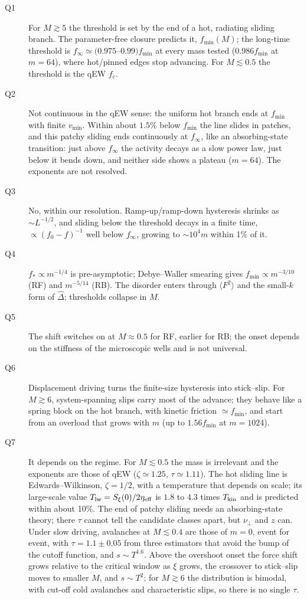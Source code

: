 \documentclass[10pt,a4paper]{article}
\newcommand{\fcs}{f_c}
\begin{document}
\begin{description}
\item[Q1] For $M\gtrsim5$ the threshold is set by the end of a hot, radiating sliding branch. The parameter-free closure predicts it, $f_{\min}(M)$; the long-time threshold is $f_\infty\simeq(0.975$--$0.99)f_{\min}$ at every mass tested ($0.986f_{\min}$ at $m=64$), where hot/pinned edges stop advancing. For $M\lesssim0.5$ the threshold is the qEW $\fcs$.
\item[Q2] Not continuous in the qEW sense: the uniform hot branch ends at $f_{\min}$ with finite $v_{\min}$. Within about $1.5\%$ below $f_{\min}$ the line slides in patches, and this patchy sliding ends continuously at $f_\infty$, like an absorbing-state transition: just above $f_\infty$ the activity decays as a slow power law, just below it bends down, and neither side shows a plateau ($m=64$). The exponents are not resolved.
\item[Q3] No, within our resolution. Ramp-up/ramp-down hysteresis shrinks as $\sim L^{-1/2}$, and sliding below the threshold decays in a finite time, $\propto(f_0-f)^{-1}$ well below $f_\infty$, growing to $\sim10^4m$ within 1\% of it.
\item[Q4] $f_*\propto m^{-1/4}$ is pre-asymptotic; Debye--Waller smearing gives $f_{\min}\propto m^{-3/10}$ (RF) and $m^{-5/14}$ (RB). The disorder enters through $\langle F^2\rangle$ and the small-$k$ form of $\hat\Delta$; thresholds collapse in $M$.
\item[Q5] The shift switches on at $M\approx0.5$ for RF, earlier for RB; the onset depends on the stiffness of the microscopic wells and is not universal.
\item[Q6] Displacement driving turns the finite-size hysteresis into stick--slip. For $M\gtrsim6$, system-spanning slips carry most of the advance; they behave like a spring block on the hot branch, with kinetic friction $\simeq f_{\min}$, and start from an overload that grows with $m$ (up to $1.56f_{\min}$ at $m=1024$).
\item[Q7] It depends on the regime. For $M\lesssim0.5$ the mass is irrelevant and the exponents are those of qEW ($\zeta\simeq1.25$, $\tau\simeq1.11$). The hot sliding line is Edwards--Wilkinson, $\zeta=1/2$, with a temperature that depends on scale; its large-scale value $T_{\rm lw}=S_\xi(0)/2\eta_{\rm eff}$ is $1.8$ to $4.3$ times $T_{\rm kin}$ and is predicted within about 10\%. The end of patchy sliding needs an absorbing-state theory; there $\tau$ cannot tell the candidate classes apart, but $\nu_\perp$ and $z$ can. Under slow driving, avalanches at $M\lesssim0.4$ are those of $m=0$, event for event, with $\tau=1.1\pm0.05$ from three estimators that avoid the bump of the cutoff function, and $s\sim T^{1.6}$. Above the overshoot onset the force shift grows relative to the critical window as $\xi$ grows, the crossover to stick--slip moves to smaller $M$, and $s\sim T^2$; for $M\gtrsim6$ the distribution is bimodal, with cut-off cold avalanches and characteristic slips, so there is no single $\tau$.
\end{description}
\end{document}
